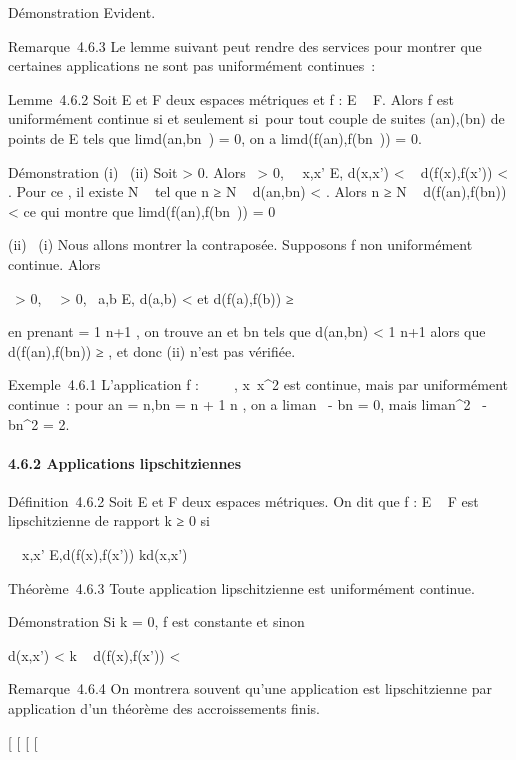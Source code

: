 Démonstration Evident.

Remarque~4.6.3 Le lemme suivant peut rendre des services pour montrer
que certaines applications ne sont pas uniformément continues~:

Lemme~4.6.2 Soit E et F deux espaces métriques et f : E \rightarrow~ F. Alors f est
uniformément continue si et seulement si~pour tout couple de suites
(an),(bn) de points de E tels que
limd(an,bn~) = 0, on a
limd(f(an),f(bn~)) = 0.

Démonstration (i) \rigtharrow~(ii) Soit \epsilon \textgreater{} 0. Alors
\exists~\eta \textgreater{} 0,\quad
\forall~~x,x' \in E, d(x,x') \textless{} \eta \rigtharrow~
d(f(x),f(x')) \textless{} \epsilon. Pour ce \eta, il existe N \in {}~ tel que n ≥ N \rigtharrow~
d(an,bn) \textless{} \eta. Alors n ≥ N \rigtharrow~
d(f(an),f(bn)) \textless{} \epsilon ce qui montre que
limd(f(an),f(bn~)) = 0

(ii) \rigtharrow~(i) Nous allons montrer la contraposée. Supposons f non
uniformément continue. Alors

\exists~\epsilon \textgreater{} 0,
\forall~~\eta \textgreater{} 0,\quad
\exists~a,b \in E, d(a,b) \textless{}
\eta\text et d(f(a),f(b)) ≥ \epsilon

en prenant \eta = 1 \over n+1 , on trouve an
et bn tels que d(an,bn) \textless{} 1
\over n+1 alors que d(f(an),f(bn))
≥ \epsilon, et donc (ii) n'est pas vérifiée.

Exemple~4.6.1 L'application f : ~ \rightarrow~ ~,
x\mapsto~x^2 est continue, mais par
uniformément continue~: pour an = n,bn = n + 1
\over n , on a
lim\textbar{}an~ -
bn\textbar{} = 0, mais
lim\textbar{}an^2~ -
bn^2\textbar{} = 2.

\paragraph{4.6.2 Applications lipschitziennes}

Définition~4.6.2 Soit E et F deux espaces métriques. On dit que f : E \rightarrow~
F est lipschitzienne de rapport k ≥ 0 si

\forall~~x,x' \in E,\quad d(f(x),f(x')) \leq
kd(x,x')

Théorème~4.6.3 Toute application lipschitzienne est uniformément
continue.

Démonstration Si k = 0, f est constante et sinon

d(x,x') \textless{} \epsilon \over k \rigtharrow~ d(f(x),f(x'))
\textless{} \epsilon

Remarque~4.6.4 On montrera souvent qu'une application est lipschitzienne
par application d'un théorème des accroissements finis.

{[}
{[}
{[}
{[}
